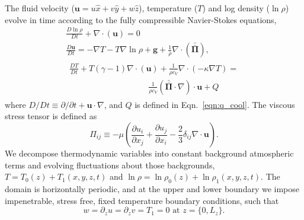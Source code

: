 \documentclass[twocolumn, amsmath, amsfonts, amssymb]{aastex62}
\newcommand{\Div}[1]{\ensuremath{\nabla\cdot\left( #1\right)}}
\newcommand{\grad}{\ensuremath{\nabla}}
\newcommand{\stressT}{\ensuremath{\bm{\bar{\bar{\Pi}}}}}
\begin{document}
The fluid velocity ($\bm{u} = u\hat{x} + v\hat{y} + w\hat{z}$), temperature ($T$)
and log density ($\ln\rho$) evolve in time according to the fully
compressible Navier-Stokes equations,
\begin{gather}
\frac{D \ln\rho}{D t} + \Div{\bm{u}} = 0
	\label{eqn:density_equation}
\\
\frac{D \bm{u}}{D t}  =
-\grad T - T \grad\ln\rho + \bm{g} + \frac{1}{\rho}\Div{\stressT}, 
	\label{eqn:momentum_equation}
\\
\begin{gathered}
\frac{D T}{D t} + T(\gamma - 1)\Div{\bm{u}}
+ \frac{1}{\rho c_V}\Div{-\kappa \grad T} = \\
\hspace{4cm}\frac{1}{\rho c_V}(\stressT\cdot\grad)\cdot\bm{u} + Q
	\label{eqn:energy_equation}
\end{gathered}
\end{gather}
where $D/Dt \equiv \partial/\partial t + \bm{u}\cdot\grad$, and $Q$ is
defined in Eqn.~\ref{eqn:q_cool}. The
viscous stress tensor is defined as 
\begin{equation}
\Pi_{ij} \equiv -\mu \left(\frac{\partial u_i}{\partial x_j} + 
\frac{\partial u_j}{\partial x_i} - \frac{2}{3}\delta_{ij}\grad\cdot\bm{u}\right).
	\label{eqn:stress_tensor}
\end{equation}
We decompose thermodynamic variables into constant background atmospheric terms
and evolving fluctuations about those backgrounds, $T = T_0(z) + T_1(x,y,z,t)$ and
$\ln\rho = \ln\rho_0(z) + \ln\rho_1(x,y,z,t)$. 
The domain is horizontally periodic, and at the upper and lower boundary
we impose impenetrable, stress free, fixed temperature boundary conditions,
such that
\begin{equation}
w = \partial_z u = \partial_z v = T_1 = 0 \text{ at } z = \{0, L_z\}.
\end{equation}
\end{document}

